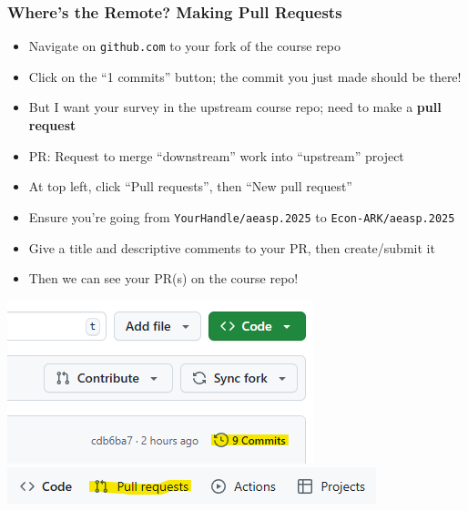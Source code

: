 \documentclass[aspectratio=169]{beamer}
\begin{document}
\begin{frame}
\frametitle{Where's the Remote? Making Pull Requests}
\begin{itemize}
	\item Navigate on \texttt{github.com} to your fork of the course repo
	
	\item Click on the ``1 commits'' button; the commit you just made should be there!
	
	\item <2->But I want your survey in the upstream course repo; need to make a \textbf{pull request}
	
	\item <2->PR: Request to merge ``downstream'' work into ``upstream'' project
	
	\item <3->At top left, click ``Pull requests'', then ``New pull request''
	
	\item <3->Ensure you're going from \texttt{YourHandle/aeasp.2025} to \texttt{Econ-ARK/aeasp.2025}
	
	\item <3->Give a title and descriptive comments to your PR, then create/submit it
	
	\item <4->Then we can see your PR(s) on the course repo!
\end{itemize}

\includegraphics[scale=0.5]{../../media/github_commits.png}~~~~~~~~~~~~~\includegraphics[scale=0.5]{../../media/github_pullrequest.png}

\end{frame}

\end{document}
